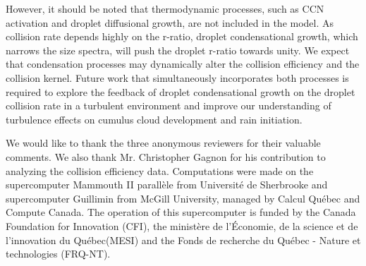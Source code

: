 However, it should be noted that thermodynamic processes, such as CCN activation and droplet diffusional growth, are not included in the model. As collision rate depends highly on the r-ratio, droplet condensational growth, which narrows the size spectra, will push the droplet r-ratio towards unity. We expect that condensation processes may dynamically alter the collision efficiency and the collision kernel. Future work that simultaneously incorporates both processes is required to explore the feedback of droplet condensational growth on the droplet collision rate in a turbulent environment and improve our understanding of turbulence effects on cumulus cloud development and rain initiation.

\acknowledgments
We would like to thank the three anonymous reviewers for their valuable comments. We also thank Mr. Christopher Gagnon for his contribution to analyzing the collision efficiency data. Computations were made on the supercomputer Mammouth II parall\`{e}le from Universit\'{e} de Sherbrooke and supercomputer Guillimin from McGill University, managed by Calcul Qu\'{e}bec and Compute Canada. The operation of this supercomputer is funded by the Canada Foundation for Innovation (CFI), the minist\`{e}re de l'\'{E}conomie, de la science et de l'innovation du  Qu\'{e}bec(MESI) and the Fonds de recherche du Qu\'{e}bec - Nature et technologies (FRQ-NT).


\cleardoublepage 
